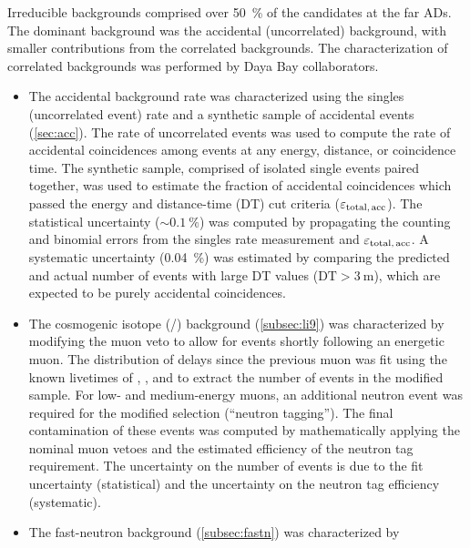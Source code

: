 Irreducible backgrounds comprised over \SI{50}{\percent} of the \nuebar{} candidates
at the far ADs.
The dominant background was the accidental (uncorrelated) background,
with smaller contributions from the correlated backgrounds.
The characterization of correlated backgrounds was performed by Daya Bay collaborators.

\begin{itemize}
    \item The accidental background rate was characterized using
        the singles (uncorrelated event) rate
        and a synthetic sample of accidental events (\cref{sec:acc}).
        The rate of uncorrelated events was used to compute the rate
        of accidental coincidences among events at any energy,
        distance, or coincidence time.
        The synthetic sample, comprised of isolated single events paired together,
        was used to estimate the fraction of accidental coincidences
        which passed the energy and distance-time (DT) cut criteria
        ($\varepsilon_{\text{total,\,acc}}$).
        The statistical uncertainty ($\sim\SI{0.1}{\percent}$) was computed
        by propagating the counting and binomial errors
        from the singles rate measurement and $\varepsilon_{\text{total,\,acc}}$.
        A systematic uncertainty (\SI{0.04}{\percent}) was estimated
        by comparing the predicted and actual number of events
        with large DT values ($\text{DT} > \SI{3}{\m}$),
        which are expected to be purely accidental coincidences.
    \item The cosmogenic isotope (\li{}/\he{}) background (\cref{subsec:li9})
        was characterized by modifying the muon veto
        to allow for events shortly following an energetic muon.
        The distribution of delays since the previous muon
        was fit using the known livetimes of \li{}, \he{}, and \boron{}
        to extract the number of events in the modified sample.
        For low- and medium-energy muons, an additional neutron event
        was required for the modified selection (``neutron tagging'').
        The final contamination of these events was computed
        by mathematically applying the nominal muon vetoes
        and the estimated efficiency of the neutron tag requirement.
        The uncertainty on the number of events is due to
        the fit uncertainty (statistical)
        and the uncertainty on the neutron tag efficiency
        (systematic).
    \item The fast-neutron background (\cref{subsec:fastn}) was characterized by

\end{itemize}

